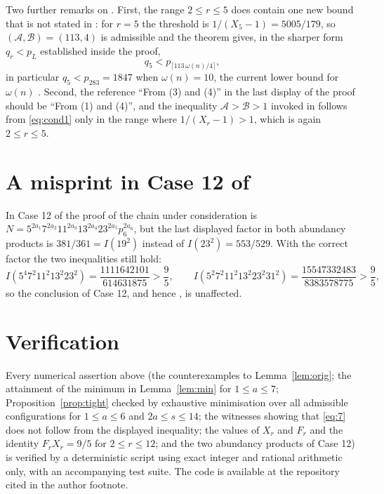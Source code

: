 \documentclass[11pt,a4paper]{article}
\theoremstyle{plain}
\theoremstyle{definition}
\newcommand{\Iab}{I}
\begin{document}
Two further remarks on \cite{M10}. First, the range $2\le r\le 5$ does contain one
new bound that is not stated in \cite{M10}: for $r=5$ the threshold is
$1/(X_{5}-1)=5005/179$, so $(\mathcal{A},\mathcal{B})=(113,4)$ is admissible and the
theorem gives, in the sharper form $q_{r}<p_{L}$ established inside the proof,
\[
  q_{5}<p_{\lceil 113\,\omega(n)/4\rceil},
\]
in particular $q_{5}<p_{283}=1847$ when $\omega(n)=10$, the current lower bound for
$\omega(n)$ \cite{Thackeray}. Second, the reference ``From (3) and (4)'' in the last
display of the proof should be ``From (1) and (4)'', and the inequality
$\mathcal{A}>\mathcal{B}>1$ invoked in \cite[Remark 1.1]{M10} follows from
\eqref{eq:cond1} only in the range where $1/(X_{r}-1)>1$, which is again $2\le r\le5$.

\section{A misprint in Case 12 of \cite[Theorem 1.2]{CMM10}}

In Case 12 of the proof of \cite[Theorem 1.2]{CMM10} the chain under consideration is
$N=5^{2a_{1}}7^{2a_{2}}11^{2a_{3}}13^{2a_{4}}23^{2a_{5}}p_{6}^{2a_{6}}$, but the last
displayed factor in both abundancy products is $381/361=\Iab(19^{2})$ instead of
$\Iab(23^{2})=553/529$. With the correct factor the two inequalities still hold:
\[
  \Iab(5^{4}7^{2}11^{2}13^{2}23^{2})=\frac{1111642101}{614631875}>\frac95,
  \qquad
  \Iab(5^{2}7^{2}11^{2}13^{2}23^{2}31^{2})=\frac{15547332483}{8383578775}>\frac95 ,
\]
so the conclusion of Case 12, and hence \cite[Theorem 1.2]{CMM10}, is unaffected.

\section{Verification}\label{sec:verif}

Every numerical assertion above (the counterexamples to Lemma~\ref{lem:orig}; the
attainment of the minimum in Lemma~\ref{lem:min} for $1\le a\le 7$;
Proposition~\ref{prop:tight} checked by exhaustive minimisation over all admissible
configurations for $1\le a\le 6$ and $2a\le s\le 14$; the witnesses showing that
\eqref{eq:7} does not follow from the displayed inequality; the values of $X_{r}$ and
$F_{r}$ and the identity $F_{r}X_{r}=9/5$ for $2\le r\le 12$; and the two abundancy
products of Case 12) is verified by a deterministic script using exact integer and
rational arithmetic only, with an accompanying test suite. The code is available at
the repository cited in the author footnote.
\end{document}
